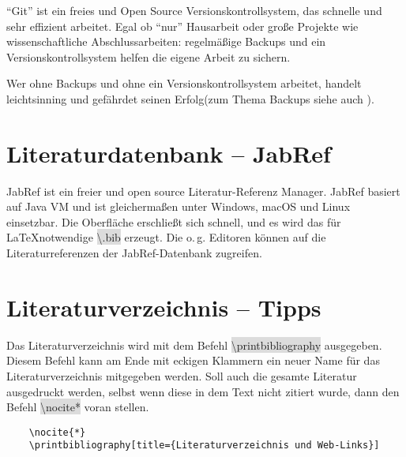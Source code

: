 \documentclass[12pt,	%
				headings=small,		%
				toc=bibliography,	%
			]	%
{scrreprt}		%
\newcommand{\inlinecode}[1]{\colorbox{Gainsboro}{\textsf{\textbackslash#1}}} %
\begin{document}
\enquote{Git} ist ein freies und Open Source Versionskontrollsystem, das schnelle und sehr effizient arbeitet.\autocite{ProGit} Egal ob \enquote{nur} Hausarbeit oder große Projekte wie wissenschaftliche Abschlussarbeiten: regelmäßige Backups und ein Versionskontrollsystem helfen die eigene Arbeit zu sichern. 

Wer ohne Backups und ohne ein Versionskontrollsystem arbeitet, handelt leichtsinning und gefährdet seinen Erfolg(zum Thema Backups siehe auch \autocite{rmf:workflow}).


\section{Literaturdatenbank – JabRef}
\label{JabRef}
JabRef ist ein freier und  open source Literatur-Referenz Manager. JabRef basiert auf Java VM und ist gleichermaßen unter Windows, macOS und Linux einsetzbar. Die Oberfläche erschließt sich schnell, und es wird das für \LaTeX notwendige \inlinecode{*.bib} erzeugt. Die o.\,g. Editoren können auf die Literaturreferenzen der JabRef-Datenbank zugreifen.\autocite{JabRef}
\section{Literaturverzeichnis – Tipps}
Das Literaturverzeichnis wird mit dem Befehl \inlinecode{printbibliography} ausgegeben. Diesem Befehl kann am Ende mit eckigen Klammern ein neuer Name für das Literaturverzeichnis mitgegeben werden. Soll auch die gesamte Literatur ausgedruckt werden, selbst wenn diese in dem Text nicht zitiert wurde, dann den Befehl \inlinecode{nocite{*}} voran stellen.

\begin{lstlisting}
	\nocite{*}
	\printbibliography[title={Literaturverzeichnis und Web-Links}]
\end{lstlisting}

\label{sec:LiteraturverzeichnisTipps}




\nocite{*}	%
\printbibliography[title={Literaturverzeichnis und Web-Links}]	%
	
\end{document}
